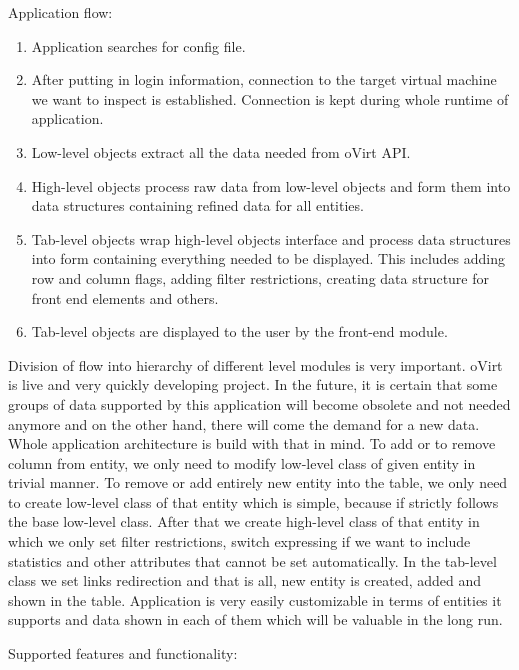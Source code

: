 Application flow:
\begin{enumerate}
\item Application searches for config file.
\item After putting in login information, connection to the target virtual machine we want to inspect is established. Connection is kept during whole runtime of application. 
\item Low-level objects extract all the data needed from oVirt API.
\item High-level objects process raw data from low-level objects and form them into data structures containing refined data for all entities.
\item Tab-level objects wrap high-level objects interface and process data structures into form containing everything needed to be displayed. This includes adding row and column flags, adding filter restrictions, creating data structure for front end elements and others.
\item Tab-level objects are displayed to the user by the front-end module.
\end{enumerate}
Division of flow into hierarchy of different level modules is very important. oVirt is live and very quickly developing project. In the future, it is certain that some groups of data supported by this application will become obsolete and not needed anymore and on the other hand, there will come the demand for a new data. Whole application architecture is build with that in mind. To add or to remove column from entity, we only need to modify low-level class of given entity in trivial manner. To remove or add entirely new entity into the table, we only need to create low-level class of that entity which is simple, because if strictly follows the base low-level class. After that we create high-level class of that entity in which we only set filter restrictions, switch expressing if we want to include statistics and other attributes that cannot be set automatically. In the tab-level class we set links redirection and that is all, new entity is created, added and shown in the table. Application is very easily customizable in terms of entities it supports and data shown in each of them which will be valuable in the long run.

Supported features and functionality:

